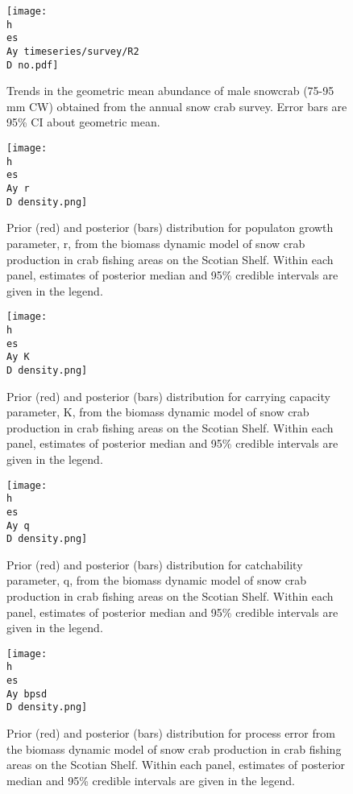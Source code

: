 \documentclass[11pt]{article}
\newcommand{\D}{.}
\newcommand{\h}{C:/} %
\newcommand{\es}{bio.data/bio.snowcrab/} %
\newcommand{\Ay}{assessments/2017/}
\begin{document}
\begin{figure}
\centering
	\texttt{[image: \\h \\es \\Ay timeseries/survey/R2\\D no.pdf]}\\ 
\caption{Trends in the geometric mean abundance of male snowcrab (75-95 mm CW) obtained from the annual snow crab survey. Error bars are 95\% CI about geometric mean.}
\end{figure}
\clearpage




\begin{figure}   
    \texttt{[image: \\h \\es \\Ay r\\D density.png]}
\caption{Prior (red) and posterior (bars) distribution for populaton growth parameter, r, from the biomass dynamic model of snow crab production in crab fishing areas on the Scotian Shelf. Within each panel, estimates of posterior median and 95\% credible intervals are given in the legend.}
\end{figure}
\clearpage

\begin{figure} 
	\texttt{[image: \\h \\es \\Ay K\\D density.png]}
	\caption{Prior (red) and posterior (bars) distribution for carrying capacity parameter, K, from the biomass dynamic model of snow crab production in crab fishing areas on the Scotian Shelf. Within each panel, estimates of posterior median and 95\% credible intervals are given in the legend.} 
\end{figure}
\clearpage


\begin{figure}  
    \texttt{[image: \\h \\es \\Ay q\\D density.png]}
\caption{Prior (red) and posterior (bars) distribution for catchability parameter, q, from the biomass dynamic model of snow crab production in crab fishing areas on the Scotian Shelf. Within each panel, estimates of posterior median and 95\% credible intervals are given in the legend.}  
\end{figure}
\clearpage


\begin{figure}    
    \texttt{[image: \\h \\es \\Ay bpsd\\D density.png]}
\caption{Prior (red) and posterior (bars) distribution for process error from the biomass dynamic model of snow crab production in crab fishing areas on the Scotian Shelf. Within each panel, estimates of posterior median and 95\% credible intervals are given in the legend.}  
\end{figure}
\clearpage
\end{document}
